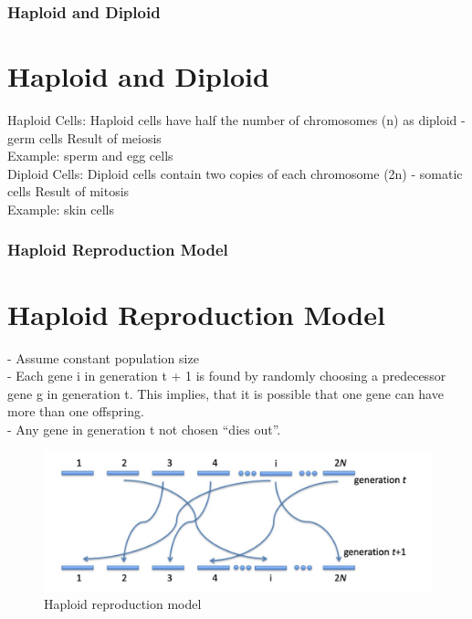 \documentclass{beamer}
\begin{document}
    \begin{frame}
        \frametitle{Haploid and Diploid}
        \section*{Haploid and Diploid}
        Haploid Cells:
        Haploid cells have half the number of chromosomes (n) as diploid - germ cells Result of meiosis\\
        Example: sperm and egg cells\\
        Diploid Cells:
        Diploid cells contain two copies of each chromosome (2n) - somatic cells Result of mitosis\\
        Example: skin cells

    
        
    
    \end{frame}
    \begin{frame}
        \frametitle{Haploid Reproduction Model}
        \section*{Haploid Reproduction Model}
       - Assume constant population size\\
       - Each gene i in generation t + 1 is found by randomly choosing a predecessor gene g in generation t. This implies, that it is possible that one gene can have more than one offspring.\\
       - Any gene in generation t not chosen “dies out”.
        \begin{figure}
         \includegraphics[width=\textwidth]{haploidRep.png}
            \caption{Haploid reproduction model}
        \end{figure}
 
    \end{frame}
\end{document}

